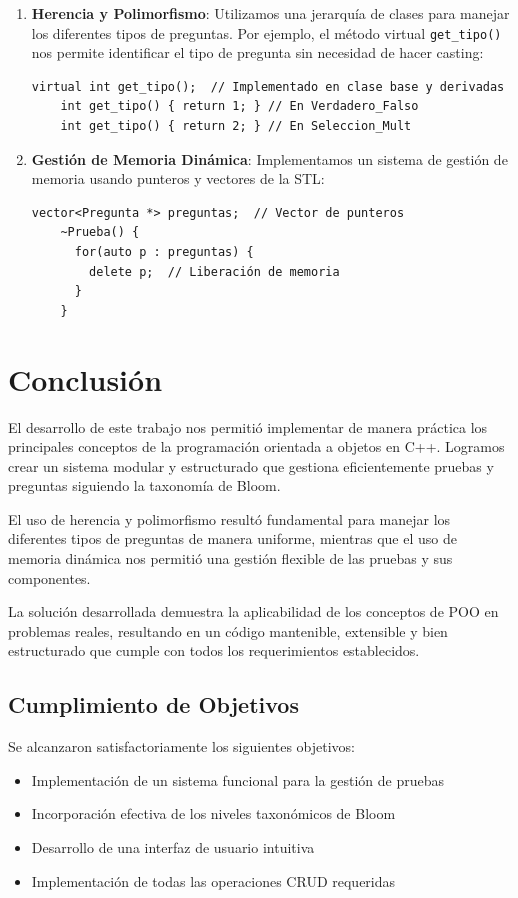 \documentclass[12pt]{article}
\begin{document}
\begin{enumerate}
    \item \textbf{Herencia y Polimorfismo}: Utilizamos una jerarqu\'ia de clases para manejar los diferentes tipos de preguntas. Por ejemplo, el m\'etodo virtual \texttt{get\_tipo()} nos permite identificar el tipo de pregunta sin necesidad de hacer casting:
    \begin{lstlisting}[style=customc]
    virtual int get_tipo();  // Implementado en clase base y derivadas
    int get_tipo() { return 1; } // En Verdadero_Falso
    int get_tipo() { return 2; } // En Seleccion_Mult
    \end{lstlisting}

    \item \textbf{Gesti\'on de Memoria Din\'amica}: Implementamos un sistema de gesti\'on de memoria usando punteros y vectores de la STL:
    \begin{lstlisting}[style=customc]
    vector<Pregunta *> preguntas;  // Vector de punteros
    ~Prueba() {
      for(auto p : preguntas) {
        delete p;  // Liberación de memoria
      }
    }
    \end{lstlisting}
\end{enumerate}

\section{Conclusi\'on}
El desarrollo de este trabajo nos permiti\'o implementar de manera pr\'actica los principales conceptos de la programaci\'on orientada a objetos en C++. Logramos crear un sistema modular y estructurado que gestiona eficientemente pruebas y preguntas siguiendo la taxonom\'ia de Bloom.

El uso de herencia y polimorfismo result\'o fundamental para manejar los diferentes tipos de preguntas de manera uniforme, mientras que el uso de memoria din\'amica nos permiti\'o una gesti\'on flexible de las pruebas y sus componentes.

La soluci\'on desarrollada demuestra la aplicabilidad de los conceptos de POO en problemas reales, resultando en un c\'odigo mantenible, extensible y bien estructurado que cumple con todos los requerimientos establecidos.

\subsection{Cumplimiento de Objetivos}
Se alcanzaron satisfactoriamente los siguientes objetivos:
\begin{itemize}
    \item Implementaci\'on de un sistema funcional para la gesti\'on de pruebas
    \item Incorporaci\'on efectiva de los niveles taxon\'omicos de Bloom
    \item Desarrollo de una interfaz de usuario intuitiva
    \item Implementaci\'on de todas las operaciones CRUD requeridas
\end{itemize}
\end{document}
